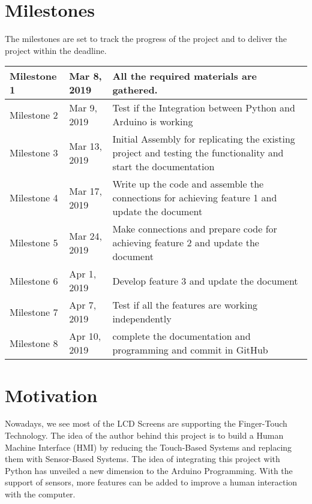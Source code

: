 \documentclass[journal]{IEEEtran}
\begin{document}
\section{Milestones}
The milestones are set to track the progress of the project and to deliver the project within the deadline.

\begin{center}
\begin{tabular}{ | m{10em} | m{4cm}| m{8cm} | } 
\hline
 Milestone 1 & Mar 8, 2019 & All the required materials are gathered. \\ 
\hline
Milestone 2 & Mar 9, 2019 & Test if the Integration between Python and Arduino is working \\ 
\hline
Milestone 3 & Mar 13, 2019 & Initial Assembly for replicating the existing project and testing the functionality and start the documentation\\ 
\hline
Milestone 4 & Mar 17, 2019 & Write up the code and assemble the connections for achieving feature 1 and update the document\\ 
\hline
Milestone 5 & Mar 24, 2019 & Make connections and prepare code for achieving feature 2 and update the document\\ 
\hline
Milestone 6 & Apr 1, 2019 & Develop feature 3 and update the document\\ 
\hline
Milestone 7 & Apr 7, 2019 & Test if all the features are working independently \\ 
\hline
Milestone 8 & Apr 10, 2019 & complete the documentation and programming and commit in GitHub \\ 
\hline
\end{tabular}
\end{center}

\newpage

\section{Motivation}
Nowadays, we see most of the LCD Screens are supporting the Finger-Touch Technology. The idea of the author behind this project is to build a Human Machine Interface (HMI) by reducing the Touch-Based Systems and replacing them with Sensor-Based Systems.  The idea of integrating this project with Python has unveiled a new dimension to the Arduino Programming. With the support of sensors, more features can be added to improve a human interaction with the computer.
\end{document}
